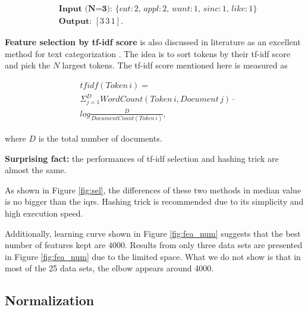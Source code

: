 \documentclass{sig-alternate-05-2015}
\begin{document}
\begin{equation*}
\begin{aligned}
    &\textbf{Input (N=3): }\{eat: 2,\, appl: 2,\, want: 1,\, sinc: 1,\,like: 1\}\\
    &\textbf{Output: }[3 \, 3 \, 1].
\end{aligned}
\end{equation*}

\textbf{Feature selection by tf-idf score} is also discussed in literature as an excellent method for text categorization \cite{menzies2006improving}. The idea is to sort tokens by their tf-idf score and pick the $N$ largest tokens. The tf-idf score mentioned here is measured as

\begin{equation*}
\begin{aligned}
   &tfidf(Token \,i)=\\
   &\Sigma^{D}_{j=1} WordCount(Token\, i, Document \,j)\cdot\\
   &log\frac{D}{DocumentCount(Token\,i)}, 
\end{aligned}
\end{equation*}

where $D$ is the total number of documents.


\textbf{Surprising fact:} the performances of tf-idf selection and hashing trick are almost the same. 

As shown in Figure \ref{fig:sel}, the differences of these two methods in median value is no bigger than the iqrs. Hashing trick is recommended due to its simplicity and high execution speed. 


Additionally, learning curve shown in Figure \ref{fig:fea_num} suggests that the best number of features kept are $4000$. Results from only three data sets are presented in Figure \ref{fig:fea_num} due to the limited space. What we do not show is that in most of the 25 data sets, the elbow appears around 4000.

\subsection{Normalization}
\end{document}
